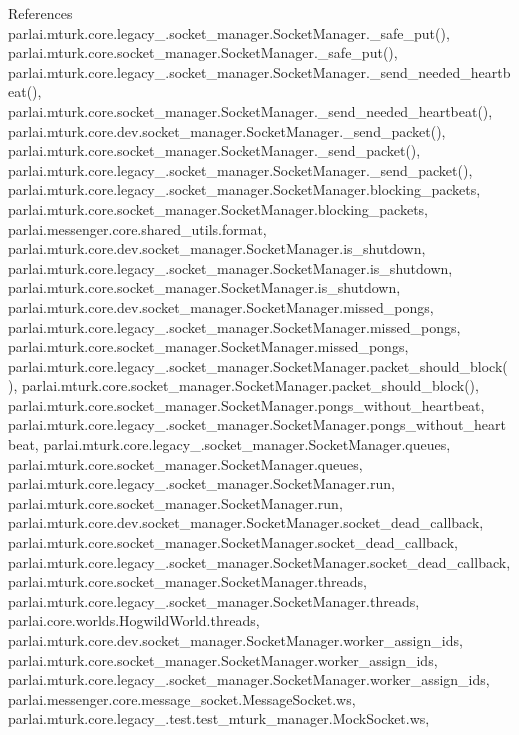 References parlai.\+mturk.\+core.\+legacy\+\_.\+socket\+\_\+manager.\+Socket\+Manager.\+\_\+safe\+\_\+put(), parlai.\+mturk.\+core.\+socket\+\_\+manager.\+Socket\+Manager.\+\_\+safe\+\_\+put(), parlai.\+mturk.\+core.\+legacy\+\_.\+socket\+\_\+manager.\+Socket\+Manager.\+\_\+send\+\_\+needed\+\_\+heartbeat(), parlai.\+mturk.\+core.\+socket\+\_\+manager.\+Socket\+Manager.\+\_\+send\+\_\+needed\+\_\+heartbeat(), parlai.\+mturk.\+core.\+dev.\+socket\+\_\+manager.\+Socket\+Manager.\+\_\+send\+\_\+packet(), parlai.\+mturk.\+core.\+socket\+\_\+manager.\+Socket\+Manager.\+\_\+send\+\_\+packet(), parlai.\+mturk.\+core.\+legacy\+\_.\+socket\+\_\+manager.\+Socket\+Manager.\+\_\+send\+\_\+packet(), parlai.\+mturk.\+core.\+legacy\+\_.\+socket\+\_\+manager.\+Socket\+Manager.\+blocking\+\_\+packets, parlai.\+mturk.\+core.\+socket\+\_\+manager.\+Socket\+Manager.\+blocking\+\_\+packets, parlai.\+messenger.\+core.\+shared\+\_\+utils.\+format, parlai.\+mturk.\+core.\+dev.\+socket\+\_\+manager.\+Socket\+Manager.\+is\+\_\+shutdown, parlai.\+mturk.\+core.\+legacy\+\_.\+socket\+\_\+manager.\+Socket\+Manager.\+is\+\_\+shutdown, parlai.\+mturk.\+core.\+socket\+\_\+manager.\+Socket\+Manager.\+is\+\_\+shutdown, parlai.\+mturk.\+core.\+dev.\+socket\+\_\+manager.\+Socket\+Manager.\+missed\+\_\+pongs, parlai.\+mturk.\+core.\+legacy\+\_.\+socket\+\_\+manager.\+Socket\+Manager.\+missed\+\_\+pongs, parlai.\+mturk.\+core.\+socket\+\_\+manager.\+Socket\+Manager.\+missed\+\_\+pongs, parlai.\+mturk.\+core.\+legacy\+\_.\+socket\+\_\+manager.\+Socket\+Manager.\+packet\+\_\+should\+\_\+block(), parlai.\+mturk.\+core.\+socket\+\_\+manager.\+Socket\+Manager.\+packet\+\_\+should\+\_\+block(), parlai.\+mturk.\+core.\+socket\+\_\+manager.\+Socket\+Manager.\+pongs\+\_\+without\+\_\+heartbeat, parlai.\+mturk.\+core.\+legacy\+\_.\+socket\+\_\+manager.\+Socket\+Manager.\+pongs\+\_\+without\+\_\+heartbeat, parlai.\+mturk.\+core.\+legacy\+\_.\+socket\+\_\+manager.\+Socket\+Manager.\+queues, parlai.\+mturk.\+core.\+socket\+\_\+manager.\+Socket\+Manager.\+queues, parlai.\+mturk.\+core.\+legacy\+\_.\+socket\+\_\+manager.\+Socket\+Manager.\+run, parlai.\+mturk.\+core.\+socket\+\_\+manager.\+Socket\+Manager.\+run, parlai.\+mturk.\+core.\+dev.\+socket\+\_\+manager.\+Socket\+Manager.\+socket\+\_\+dead\+\_\+callback, parlai.\+mturk.\+core.\+socket\+\_\+manager.\+Socket\+Manager.\+socket\+\_\+dead\+\_\+callback, parlai.\+mturk.\+core.\+legacy\+\_.\+socket\+\_\+manager.\+Socket\+Manager.\+socket\+\_\+dead\+\_\+callback, parlai.\+mturk.\+core.\+socket\+\_\+manager.\+Socket\+Manager.\+threads, parlai.\+mturk.\+core.\+legacy\+\_.\+socket\+\_\+manager.\+Socket\+Manager.\+threads, parlai.\+core.\+worlds.\+Hogwild\+World.\+threads, parlai.\+mturk.\+core.\+dev.\+socket\+\_\+manager.\+Socket\+Manager.\+worker\+\_\+assign\+\_\+ids, parlai.\+mturk.\+core.\+socket\+\_\+manager.\+Socket\+Manager.\+worker\+\_\+assign\+\_\+ids, parlai.\+mturk.\+core.\+legacy\+\_.\+socket\+\_\+manager.\+Socket\+Manager.\+worker\+\_\+assign\+\_\+ids, parlai.\+messenger.\+core.\+message\+\_\+socket.\+Message\+Socket.\+ws, parlai.\+mturk.\+core.\+legacy\+\_.\+test.\+test\+\_\+mturk\+\_\+manager.\+Mock\+Socket.\+ws, 
